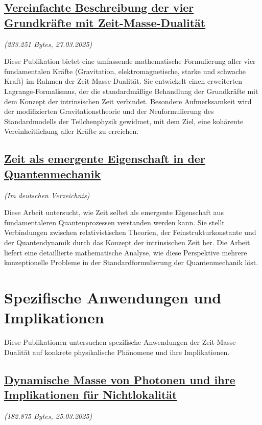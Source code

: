 \documentclass[a4paper,12pt]{article}
\newcommand{\repobase}{https://github.com/jpascher/T0-Time-Mass-Duality/tree/main/2/}
\begin{document}
	\subsection{\href{\repobase/pdf/Deutsch/Vereinfachte Beschreibung der vier Grundkräfte mit Zeit-Masse-Dualität.pdf}{Vereinfachte Beschreibung der vier Grundkräfte mit Zeit-Masse-Dualität}}
	\textit{(233.251 Bytes, 27.03.2025)}
	
	Diese Publikation bietet eine umfassende mathematische Formulierung aller vier fundamentalen Kräfte (Gravitation, elektromagnetische, starke und schwache Kraft) im Rahmen der Zeit-Masse-Dualität. Sie entwickelt einen erweiterten Lagrange-Formalismus, der die standardmäßige Behandlung der Grundkräfte mit dem Konzept der intrinsischen Zeit verbindet. Besondere Aufmerksamkeit wird der modifizierten Gravitationstheorie und der Neuformulierung des Standardmodells der Teilchenphysik gewidmet, mit dem Ziel, eine kohärente Vereinheitlichung aller Kräfte zu erreichen.
	
	\subsection{\href{\repobase/pdf/Deutsch/Zeit als emergente Eigenschaft in der Quantenmechanik.pdf}{Zeit als emergente Eigenschaft in der Quantenmechanik}}
	\textit{(Im deutschen Verzeichnis)}
	
	Diese Arbeit untersucht, wie Zeit selbst als emergente Eigenschaft aus fundamentaleren Quantenprozessen verstanden werden kann. Sie stellt Verbindungen zwischen relativistischen Theorien, der Feinstrukturkonstante und der Quantendynamik durch das Konzept der intrinsischen Zeit her. Die Arbeit liefert eine detaillierte mathematische Analyse, wie diese Perspektive mehrere konzeptionelle Probleme in der Standardformulierung der Quantenmechanik löst.
	
	\section{Spezifische Anwendungen und Implikationen}
	
	Diese Publikationen untersuchen spezifische Anwendungen der Zeit-Masse-Dualität auf konkrete physikalische Phänomene und ihre Implikationen.
	
	\subsection{\href{\repobase/pdf/Deutsch/Dynamische Masse von Photonen und ihre Implikationen für Nichtlokalität.pdf}{Dynamische Masse von Photonen und ihre Implikationen für Nichtlokalität}}
	\textit{(182.875 Bytes, 25.03.2025)}
	
\end{document}
